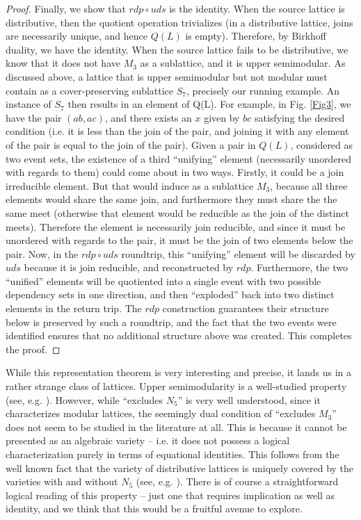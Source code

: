 \documentclass[a4paper,USenglish,cleveref, autoref, thm-restate,authorcolumns]{lipics-v2019}
\begin{document}
\begin{proof}
Finally, we show that \(rdp \circ uds\) is the identity. When the source lattice is distributive, then the quotient operation trivializes (in a distributive lattice, joins are necessarily unique, and hence \(Q(L)\) is empty). Therefore, by Birkhoff duality, we have the identity. When the source lattice fails to be distributive, we know that it does not have \(M_3\) as a sublattice, and it is upper semimodular. As discussed above, a lattice that is upper semimodular but not modular must contain as a cover-preserving sublattice \(S_7\), precisely our running example. An instance of \(S_7\) then results in an element of Q(L). For example, in Fig. \ref{Fig3},  we have the pair \((ab,ac)\), and there exists an \(x\) given by \(bc\) satisfying the desired condition (i.e. it is less than the join of the pair, and joining it with any element of the pair is equal to the join of the pair). Given a pair in \(Q(L)\), considered as two event sets, the existence of a third ``unifying'' element (necessarily unordered with regards to them) could come about in two ways. Firstly, it could be a join irreducible element. But that would induce as a sublattice \(M_3\), because all three elements would share the same join, and furthermore they must share the the same meet (otherwise that element would be reducible as the join of the distinct meets). Therefore the element is necessarily join reducible, and since it must be unordered with regards to the pair, it must be the join of two elements below the pair. Now, in the \(rdp \circ uds\) roundtrip, this ``unifying'' element will be discarded by \(uds\) because it is join reducible, and reconstructed by \(rdp\). Furthermore, the two ``unified'' elements will be quotiented into a single event with two possible dependency sets in one direction, and then ``exploded'' back into two distinct elements in the return trip. The \(rdp\) construction guarantees their structure below is preserved by such a roundtrip, and the fact that the two events were identified ensures that no additional structure above was created. This completes the proof.
\end{proof}

While this representation theorem is very interesting and precise, it lands us in a rather strange class of lattices. Upper semimodularity is a well-studied property (see, e.g. \cite{stern1999semimodular}). However, while ``excludes \(N_5\)'' is very well understood, since it characterizes modular lattices, the seemingly dual condition of ``excludes \(M_3\)'' does not seem to be studied in the literature at all. This is because it cannot be presented as an algebraic variety -- i.e. it does not possess a logical characterization purely in terms of equational identities. This follows from the well known fact that the variety of distributive lattices is uniquely covered by the varieties with and without \(N_5\) (see, e.g. \cite{jipsen2006varieties}). There is of course a straightforward logical reading of this property -- just one that requires implication as well as identity, and we think that this would be a fruitful avenue to explore.
\end{document}
